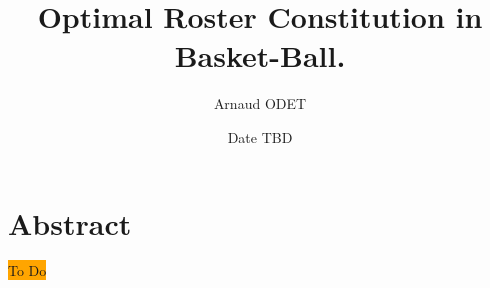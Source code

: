 \documentclass[a4paper,11pt]{article}
\title{Optimal Roster Constitution in Basket-Ball.}
\author{Arnaud ODET}
\date{Date TBD}
\newcommand{\ob}[1]{\colorbox{orange}{#1}}
\begin{document}

\maketitle


\section*{Abstract}

\ob{To Do}
















\end{document}
